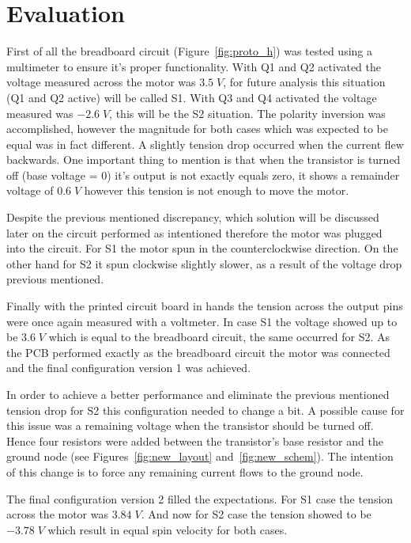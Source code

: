 \section{\textbf{Evaluation}}\label{sec:5}

	First of all the breadboard circuit (Figure~\ref{fig:proto_h}) was tested using a multimeter to ensure it's proper functionality. With Q1 and Q2 activated the voltage measured across the motor was $3.5\;V$, for future analysis this situation (Q1 and Q2 active) will be called S1. With Q3 and Q4 activated the voltage measured was $-2.6\;V$, this will be the S2 situation. The polarity inversion was accomplished, however the magnitude for both cases which was expected to be equal was in fact different. A slightly tension drop occurred when the current flew backwards. One important thing to mention is that when the transistor is turned off (base voltage = 0) it's output is not exactly equals zero, it shows a remainder voltage of $0.6\;V$ however this tension is not enough to move the motor.
	
	Despite the previous mentioned discrepancy, which solution will be discussed later on the circuit performed as intentioned therefore the motor was plugged into the circuit. For S1 the motor spun in the counterclockwise direction. On the other hand for S2 it spun clockwise slightly slower, as a result of the voltage drop previous mentioned.
	
	Finally with the printed circuit board in hands the tension across the output pins were once again measured with a voltmeter. In case S1 the voltage showed up to be $3.6\;V$ which is equal to the breadboard circuit, the same occurred for S2. As the PCB performed exactly as the breadboard circuit the motor was connected and the final configuration version 1 was achieved.
	
	In order to achieve a better performance and eliminate the previous mentioned tension drop for S2 this configuration needed to change a bit. A possible cause for this issue was a remaining voltage when the transistor should be turned off. Hence four resistors were added between the transistor's base resistor and the ground node (see Figures~\ref{fig:new_layout} and~\ref{fig:new_schem}). The intention of this change is to force any remaining current flows to the ground node.
	
	The final configuration version 2 filled the expectations. For S1 case the tension across the motor was $3.84\;V$. And now for S2 case the tension showed to be $-3.78\;V$ which result in equal spin velocity for both cases.
	
